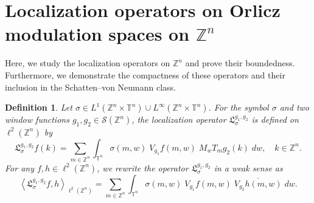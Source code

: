 \documentclass[a4paper,11pt, reqno]{amsart}
\theoremstyle{plain}
\newtheorem{Def}[theorem]{Definition}
\theoremstyle{definition}
\theoremstyle{remark}
\def \Z{{\mathbb Z}}
\def \T{{\mathbb T}}
\begin{document}
\section{Localization operators on Orlicz modulation spaces on $\Z^n$}\label{sec4}

Here, we study the localization operators on $\Z^n$ and prove their boundedness. Furthermore, we demonstrate the compactness of these operators and their inclusion in the Schatten--von Neumann class.

\begin{Def}
Let $\sigma \in L^1(\Z^n \times \T^n)  \cup  L^\infty(\Z^n \times \T^n)$. For the symbol $\sigma$ and two window functions $g_1, g_2 \in \mathcal{S} (\mathbb Z^n)$, the localization operator $\mathfrak{L}^{g_1, g_2}_{\sigma}$ is defined on $\ell^2(\Z^n)$ by 
\begin{equation}\label{eq41}
\mathfrak{L}^{g_1, g_2}_{\sigma}f(k)=\sum_{m \in \Z^n}  \int_{\T^n} \sigma(m, w) \; V_{g_1}f(m,w) \; M_w T_m g_2(k) \; dw, \quad k \in \Z^n. 
\end{equation} 
For any $f,  h \in \ell^2(\Z^n)$, we rewrite the operator $\mathfrak{L}^{g_1, g_2}_{\sigma}$ in a weak sense as 
\begin{equation}\label{eq42}
\left\langle \mathfrak{L}^{g_1, g_2}_{\sigma}f , h \right\rangle_{\ell^2(\Z^n)} = \sum_{m \in \Z^n}  \int_{\T^n} \sigma(m, w) \; V_{g_1}f(m,w) \; \overline{V_{g_2}h(m,w)} \; dw.
\end{equation}
\end{Def}
\end{document}
